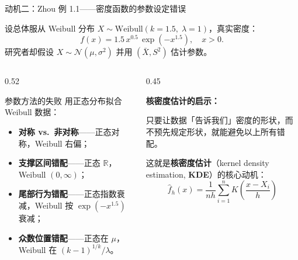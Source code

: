 \documentclass[aspectratio=169, 10pt]{beamer}
\begin{document}
\begin{frame}{动机二：Zhou 例 1.1——密度函数的参数设定错误}

  设总体服从 Weibull 分布 $X \sim \text{Weibull}(k=1.5,\; \lambda=1)$，真实密度：
  \[
    f(x) = 1.5\, x^{0.5}\, \exp(-x^{1.5}),\quad x>0.
  \]
  研究者却假设 $X\sim \mathcal{N}(\mu,\sigma^2)$ 并用 $(\bar X, S^2)$ 估计参数。

  \begin{columns}[T]
    \begin{column}{0.52\textwidth}
      \begin{examplebox}{参数方法的失败}
        用正态分布拟合 Weibull 数据：
        \begin{itemize}
          \item \textbf{对称 vs.\ 非对称}——正态对称，Weibull 右偏；
          \item \textbf{支撑区间错配}——正态 $\mathbb{R}$，Weibull $(0,\infty)$；
          \item \textbf{尾部行为错配}——正态指数衰减，Weibull 按 $\exp(-x^{1.5})$ 衰减；
          \item \textbf{众数位置错配}——正态在 $\mu$，Weibull 在 $(k-1)^{1/k}/\lambda$。
        \end{itemize}
      \end{examplebox}
    \end{column}
    \begin{column}{0.45\textwidth}
      \begin{keybox}
        \textbf{核密度估计的启示：}
        \vspace{0.3em}

        只要让数据「告诉我们」密度的形状，而不预先规定形状，就能避免以上所有错配。

        \vspace{0.3em}

        这就是\textbf{核密度估计}（kernel density estimation, \textbf{KDE}）的核心动机：
        \[
          \hat f_h(x) = \frac{1}{nh}\sum_{i=1}^n K\!\left(\frac{x-X_i}{h}\right)
        \]
      \end{keybox}
    \end{column}
  \end{columns}

\end{frame}
\end{document}
